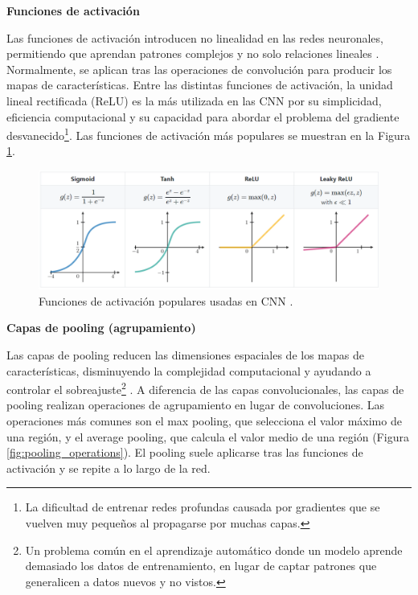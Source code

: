 \documentclass[a4paper,10pt]{book}
\begin{document}
\textbf{Funciones de activación}

Las funciones de activación introducen no linealidad en las redes neuronales, permitiendo que aprendan patrones complejos y no solo relaciones lineales \cite{langActivationFunctionsNeural2024}. Normalmente, se aplican tras las operaciones de convolución para producir los mapas de características. Entre las distintas funciones de activación, la unidad lineal rectificada (ReLU) es la más utilizada en las CNN por su simplicidad, eficiencia computacional y su capacidad para abordar el problema del gradiente desvanecido\footnote{La dificultad de entrenar redes profundas causada por gradientes que se vuelven muy pequeños al propagarse por muchas capas.}. Las funciones de activación más populares se muestran en la Figura \ref{fig:activations-functions}.

\begin{figure}
    \centering
    \includegraphics[width=1.0\linewidth]{reports//assets/activations_functions.png}
    \caption[Funciones de activación populares]{Funciones de activación populares usadas en CNN \cite{wachtelUnderstandingActivationFunctions2021}.}
    \label{fig:activations-functions}
\end{figure}

\textbf{Capas de pooling (agrupamiento)}

Las capas de pooling reducen las dimensiones espaciales de los mapas de características, disminuyendo la complejidad computacional y ayudando a controlar el sobreajuste\footnote{Un problema común en el aprendizaje automático donde un modelo aprende demasiado los datos de entrenamiento, en lugar de captar patrones que generalicen a datos nuevos y no vistos.} \cite{brownlee_gentle_2019}. A diferencia de las capas convolucionales, las capas de pooling realizan operaciones de agrupamiento en lugar de convoluciones. Las operaciones más comunes son el max pooling, que selecciona el valor máximo de una región, y el average pooling, que calcula el valor medio de una región (Figura \ref{fig:pooling_operations}). El pooling suele aplicarse tras las funciones de activación y se repite a lo largo de la red.
\end{document}
